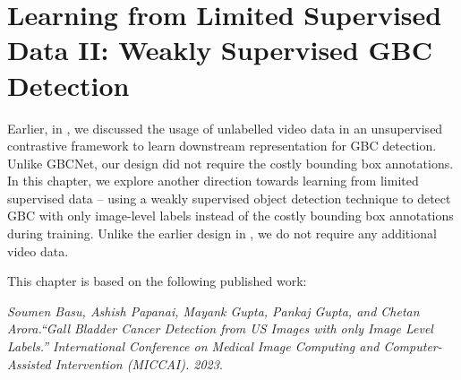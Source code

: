 
\chapter{Learning from Limited Supervised Data II: Weakly Supervised GBC Detection}
\label{chap:wsod}
Earlier, in , we discussed the usage of unlabelled video data in an unsupervised contrastive framework to learn downstream representation for GBC detection. Unlike GBCNet, our design did not require the costly bounding box annotations.
In this chapter, we explore another direction towards learning from limited supervised data -- using a weakly supervised object detection technique to detect GBC with only image-level labels instead of the costly bounding box annotations during training. Unlike the earlier design in  , we do not require any additional video data.

This chapter is based on the following published work:
\par \noindent [1] \textit{Soumen Basu, Ashish Papanai, Mayank Gupta, Pankaj Gupta, and Chetan Arora.``Gall Bladder Cancer Detection from US Images with only Image Level Labels.'' International Conference on Medical Image Computing and Computer-Assisted Intervention (MICCAI). 2023}.

